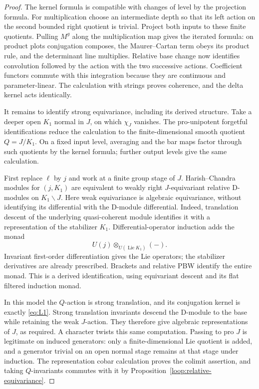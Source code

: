 \begin{proof}
The kernel formula is compatible with changes of level by the
projection formula.  For multiplication choose an intermediate
depth so that its left action on the second bounded right
quotient is trivial.  Project both inputs to these finite
quotients.  Pulling $M^g$ along the multiplication map gives the
iterated formula: on product plots conjugation composes, the
Maurer--Cartan term obeys its product rule, and the determinant
line multiplies.  Relative base change now identifies convolution
followed by the action with the two successive actions.
Coefficient functors commute with this integration because they
are continuous and parameter-linear.  The calculation with
strings proves coherence, and the delta kernel acts identically.

It remains to identify strong equivariance, including its derived
structure.  Take a deeper open $K_1$ normal in $J$, on which
$\chi_J$ vanishes.  The pro-unipotent forgetful identifications
reduce the calculation to the finite-dimensional smooth quotient
$Q=J/K_1$.  On a fixed input level, averaging and the bar maps
factor through such quotients by the kernel formula; further
output levels give the same calculation.

First replace $\ell$ by $j$ and work at a finite group stage of
$J$.  Harish--Chandra modules for $(j,K_1)$ are equivalent to
weakly right $J$-equivariant relative D-modules on $K_1\backslash J$.
Here weak equivariance is algebraic equivariance, without
identifying its differential with the D-module differential.
Indeed, translation descent of the underlying quasi-coherent
module identifies it with a representation of the stabilizer
$K_1$.  Differential-operator induction adds the monad
\[
                  U(j)\otimes_{U(\operatorname{Lie}K_1)}(-).
\]
Invariant first-order differentiation gives the Lie operators;
the stabilizer derivatives are already prescribed.  Brackets
and relative PBW identify the entire monad.  This is a derived
identification, using equivariant descent and its flat filtered
induction monad.

In this model the $Q$-action is strong translation, and its
conjugation kernel is exactly \eqref{eq:L1}.  Strong translation
invariants descend the D-module to the base while retaining the
weak $J$-action.  They therefore give algebraic representations
of $J$, as required.  A character twists this same computation.
Passing to pro $J$ is legitimate on induced generators: only a
finite-dimensional Lie quotient is added, and a generator
trivial on an open normal stage remains at that stage under
induction.  The representation cobar calculation proves the
colimit assertion, and taking $Q$-invariants commutes with it
by Proposition~\ref{loop:relative-equivariance}.


\end{proof}
